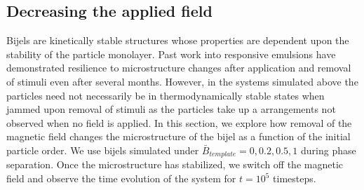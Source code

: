 \subsection{Decreasing the applied
field}\label{decreasing-the-applied-field}

Bijels are kinetically stable structures whose properties are dependent
upon the stability of the particle monolayer. Past work into responsive
emulsions have demonstrated resilience to microstructure changes after
application and removal of stimuli even after several months. However,
in the systems simulated above the particles need not necessarily be in
thermodynamically stable states when jammed upon removal of stimuli as
the particles take up a arrangements not observed when no field is
applied. In this section, we explore how removal of the magnetic field
changes the microstructure of the bijel as a function of the initial
particle order. We use bijels simulated under
\(\bar{B}_{template} = 0, 0.2, 0.5, 1\) during phase separation. Once
the microstructure has stabilized, we switch off the magnetic field and
observe the time evolution of the system for \(t = 10^5\) timesteps.

